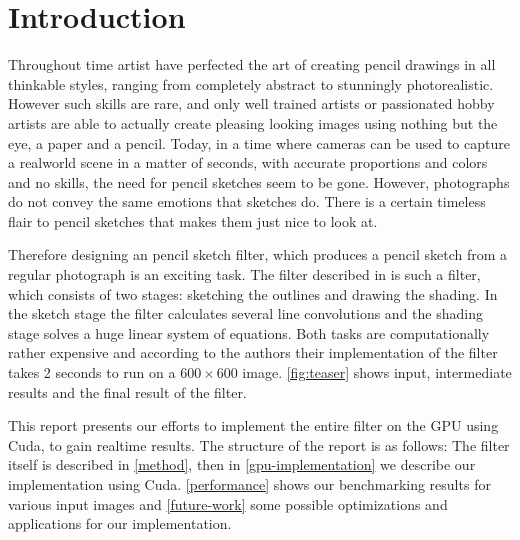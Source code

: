 \section{Introduction}
Throughout time artist have perfected the art of creating pencil drawings in all
thinkable styles, ranging from completely abstract to stunningly photorealistic.
However such skills are rare, and only well trained artists or passionated hobby
artists are able to actually create pleasing looking images using nothing but
the eye, a paper and a pencil. Today, in a time where cameras can be used to
capture a realworld scene in a matter of seconds, with accurate proportions and
colors and no skills, the need for pencil sketches seem to be gone.  However,
photographs do not convey the same emotions that sketches do. There is a certain
timeless flair to pencil sketches that makes them just nice to look at.

Therefore designing an pencil sketch filter, which produces a pencil sketch from
a regular photograph is an exciting task. The filter described in
\cite{mainPaper} is such a filter, which consists of two stages: sketching the
outlines and drawing the shading. In the sketch stage the filter calculates several
line convolutions and the shading stage solves a huge linear system of
equations. Both tasks are computationally rather expensive and according to the
authors their implementation of the filter takes 2 seconds to run on a
$600\times 600$ image. \autoref{fig:teaser} shows input, intermediate
results and the final result of the filter.

This report presents our efforts to implement the entire filter on the GPU using
Cuda, to gain realtime results. The structure of the report is as follows: The
filter itself is described in \autoref{method}, then in
\autoref{gpu-implementation} we describe our implementation using Cuda.
\autoref{performance} shows our benchmarking results for various input images
and \autoref{future-work} some possible optimizations and applications for our
implementation.
